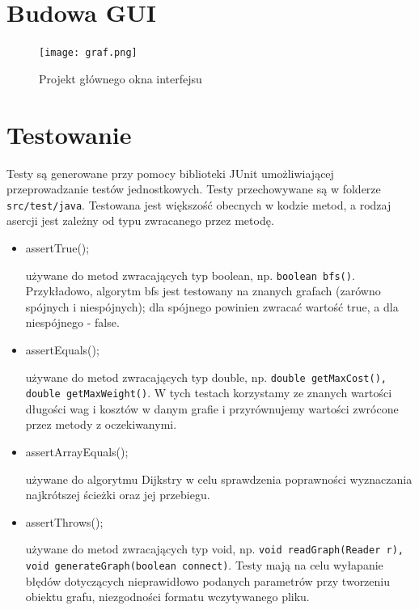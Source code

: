 \documentclass[]{article}
\begin{document}
\section{Budowa GUI}\label{header-n279}

\begin{figure}[h!]
\begin{center}
  \texttt{[image: graf.png]}
  \end{center}
  \caption{Projekt głównego okna interfejsu}
  \label{fig:graf}
\end{figure}

\section{Testowanie}\label{header-n281}
Testy są generowane przy pomocy biblioteki JUnit umożliwiającej przeprowadzanie testów jednostkowych. Testy przechowywane są w folderze \texttt{src/test/java}. Testowana jest większość obecnych w kodzie metod, a rodzaj asercji jest zależny od typu zwracanego przez metodę.

\begin{itemize}
    \item assertTrue();
    
    używane do metod zwracających typ boolean, np. \texttt{boolean bfs()}. Przykładowo, algorytm bfs jest testowany na znanych grafach (zarówno spójnych i niespójnych); dla spójnego powinien zwracać wartość true, a dla niespójnego - false.
    
    \item assertEquals();
    
    używane do metod zwracających typ double, np. \texttt{double getMaxCost(), double getMaxWeight()}. W tych testach korzystamy ze znanych wartości długości wag i kosztów w danym grafie i przyrównujemy wartości zwrócone przez metody z oczekiwanymi.
    
    \item assertArrayEquals();
    
    używane do algorytmu Dijkstry w celu sprawdzenia poprawności wyznaczania najkrótszej ścieżki oraz jej przebiegu.
    
    
    \item assertThrows();
    
    używane do metod zwracających typ void, np. \texttt{void readGraph(Reader r), void generateGraph(boolean connect)}. Testy mają na celu wyłapanie błędów dotyczących nieprawidłowo podanych parametrów przy tworzeniu obiektu grafu, niezgodności formatu wczytywanego pliku.
\end{itemize}
\end{document}
